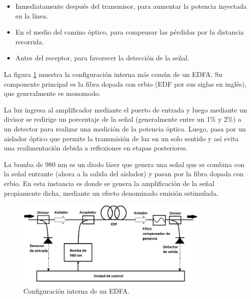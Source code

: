 \begin{itemize}
\item Inmediatamente después del transmisor, para aumentar la potencia inyectada en la línea.
\item En el medio del camino óptico, para compensar las pérdidas por la distancia recorrida.
\item Antes del receptor, para favorecer la detección de la señal.
\end{itemize}

La figura \ref{fig:EDFAinterno} muestra la configuración interna más común de un EDFA. Su componente principal es la fibra dopada con erbio (EDF por sus siglas en inglés), que generalmente es monomodo\protect\footnotemark . 


La luz ingresa al amplificador mediante el puerto de entrada y luego mediante un divisor se redirige un porcentaje de la señal (generalmente entre un 1\% y 2\%) a un detector para realizar una medición de la potencia óptica. Luego, pasa por un aislador óptico que permite la transmisión de luz en un solo sentido y así evita una realimentación debida a reflexiones en etapas posteriores.

La bomba de 980 nm es un diodo láser que genera una señal que se combina con la señal entrante (ahora a la salida del aislador) y pasan por la fibra dopada con erbio. En esta instancia es donde se genera la amplificación de la señal propiamente dicha, mediante un efecto denominado emisión estimulada\protect\footnotemark .


\begin{figure}[H]
\centering
\includegraphics[width=0.85\textwidth]{./Figures/EDFAinterno.png}
\caption{Configuración interna de un EDFA.}
\label{fig:EDFAinterno}
\end{figure}

